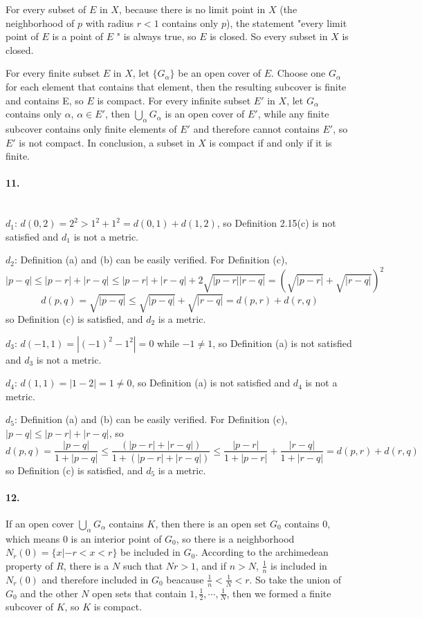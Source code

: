 \documentclass[a4paper]{article}
\begin{document}
For every subset of $E$ in $X$, because there is no limit point in $X$ (the neighborhood of $p$ with radius $r<1$ contains only $p$), the statement "every limit point of $E$ is a point of $E$ " is always true, so $E$ is closed. So every subset in $X$ is closed.

For every finite subset $E$ in $X$, let $\{G_\alpha\}$ be an open cover of $E$. Choose one $G_\alpha$ for each element that contains that element, then the resulting subcover is finite and contains E, so $E$ is compact. For every infinite subset $E'$ in $X$, let $G_\alpha$ contains only $\alpha$, $\alpha\in E'$, then $\bigcup_\alpha G_\alpha$ is an open cover of $E'$, while any finite subcover contains only finite elements of $E'$ and therefore cannot contains $E'$, so $E'$ is not compact. In conclusion, a subset in $X$ is compact if and only if it is finite.

\paragraph{11.}
\quad
\\
\noindent
$d_1$: $d(0,2)=2^2>1^2+1^2=d(0,1)+d(1,2)$, so Definition 2.15(c) is not satisfied and $d_1$ is not a metric.
\medskip

\noindent
$d_2$: Definition (a) and (b) can be easily verified. For Definition (c),
\[|p-q|\leq|p-r|+|r-q|\leq|p-r|+|r-q|+2\sqrt{|p-r||r-q|}=(\sqrt{|p-r|}+\sqrt{|r-q|})^2\]
\[
d(p,q)=\sqrt{|p-q|}\leq\sqrt{|p-q|}+\sqrt{|r-q|}=d(p,r)+d(r,q)
\]
so Definition (c) is satisfied, and $d_2$ is a metric.
\medskip

\noindent
$d_3$: $d(-1,1)=|(-1)^2-1^2|=0$ while $-1\neq1$, so Definition  (a) is not satisfied and $d_3$ is not a metric.
\medskip

\noindent
$d_4$: $d(1,1)=|1-2|=1\neq0$, so Definition (a) is not satisfied and $d_4$ is not a metric.
\medskip

\noindent
$d_5$: Definition (a) and (b) can be easily verified. For Definition (c), $|p-q|\leq|p-r|+|r-q|$, so
\[
d(p,q)=
\frac{|p-q|}{1+|p-q|}\leq\frac{(|p-r|+|r-q|)}{1+(|p-r|+|r-q|)}\leq\frac{|p-r|}{1+|p-r|}+\frac{|r-q|}{1+|r-q|}=d(p,r)+d(r,q)
\]
so Definition (c) is satisfied, and $d_5$ is a metric.

\paragraph{12.}
If an open cover $\bigcup_\alpha G_\alpha$ contains $K$, then there is an open set $G_0$ contains $0$, which means $0$ is an interior point of $G_0$, so there is a neighborhood $N_r(0)=\{x|-r<x<r\}$ be included in $G_0$. According to the archimedean property of $R$, there is a $N$ such that $Nr>1$, and if $n>N$, $\frac{1}{n}$ is included in $N_r(0)$ and therefore included in $G_0$ beacause $\frac{1}{n}<\frac{1}{N}<r$. So take the union of $G_0$ and the other $N$ open sets that contain $1,\frac{1}{2},\cdots,\frac{1}{N}$, then we formed a finite subcover of $K$, so $K$ is compact.
\end{document}
